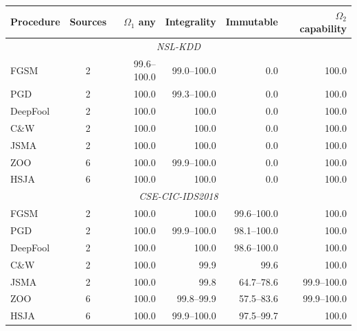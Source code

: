 \begin{tabular}{@{}lcrrrr@{}}
\toprule
Procedure & Sources & $\Omega_1$ any & Integrality & Immutable & $\Omega_2$ capability\\
\midrule
\multicolumn{6}{c}{\emph{NSL-KDD}}\\
\midrule
FGSM & 2 & 99.6--100.0 & 99.0--100.0 & 0.0 & 100.0\\
PGD & 2 & 100.0 & 99.3--100.0 & 0.0 & 100.0\\
DeepFool & 2 & 100.0 & 100.0 & 0.0 & 100.0\\
C\&W & 2 & 100.0 & 100.0 & 0.0 & 100.0\\
JSMA & 2 & 100.0 & 100.0 & 0.0 & 100.0\\
ZOO & 6 & 100.0 & 99.9--100.0 & 0.0 & 100.0\\
HSJA & 6 & 100.0 & 100.0 & 0.0 & 100.0\\
\midrule
\multicolumn{6}{c}{\emph{CSE-CIC-IDS2018}}\\
\midrule
FGSM & 2 & 100.0 & 100.0 & 99.6--100.0 & 100.0\\
PGD & 2 & 100.0 & 99.9--100.0 & 98.1--100.0 & 100.0\\
DeepFool & 2 & 100.0 & 100.0 & 98.6--100.0 & 100.0\\
C\&W & 2 & 100.0 & 99.9 & 99.6 & 100.0\\
JSMA & 2 & 100.0 & 99.8 & 64.7--78.6 & 99.9--100.0\\
ZOO & 6 & 100.0 & 99.8--99.9 & 57.5--83.6 & 99.9--100.0\\
HSJA & 6 & 100.0 & 99.9--100.0 & 97.5--99.7 & 100.0\\
\bottomrule
\end{tabular}
